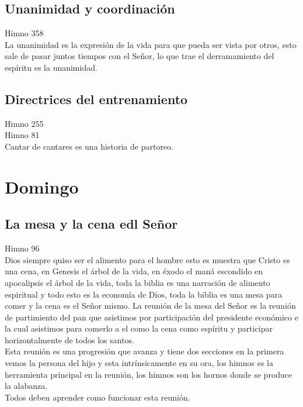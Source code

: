 \documentclass[12pt]{article}
\begin{document}
\subsection*{Unanimidad y coordinación}

Himno 358\\

La unanimidad es la expresión de la vida para que pueda ser vista por otros, esto sale de pasar juntos tiempos con el Señor, lo que trae el derramamiento del espíritu es la unanimidad.\\

\subsection*{Directrices del entrenamiento}

Himno 255\\

Himno 81\\ 

Cantar de cantares es una historia de partoreo.\\


\section*{Domingo}

\subsection*{La mesa y la cena edl Señor}

Himno 96\\
 
Dios siempre quiso ser el alimento para el hombre esto es muestra que Cristo es una cena, en Genesis el árbol de la vida, en éxodo el maná escondido en apocalipsis el árbol de la vida, toda la biblia es una narración de alimento espiritual y todo esto es la economía de Dios, toda la biblia es una mesa para comer y la cena es el Señor mismo.
La reunión de la mesa del Señor es la reunión de partimiento del pan que asistimos por participación del presidente económico e la cual asistimos para comerlo a el como la cena como espíritu y participar horizontalmente de todos los santos.\\

Esta reunión es una progresión que avanza y tiene dos secciones en la primera vemos la persona del hijo y esta intrínsicamente en su ora, los himnos es la herramienta principal en la reunión, los himnos son los hornos donde se produce la alabanza.\\

Todos deben aprender como funcionar esta reunión. 
\end{document}
